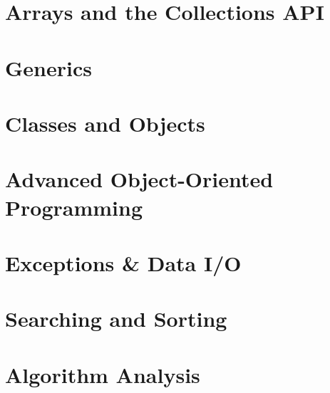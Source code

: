 \chapter{Arrays and the Collections API}
\thispagestyle{chapterstart}
\pagestyle{otherpages}
\label{chapter-arrays-collections}
\setcounter{excounter}{1}
\setcounter{examplecounter}{1}


\chapter{Generics}
\thispagestyle{chapterstart}
\pagestyle{otherpages}
\label{chapter-generics}
\setcounter{excounter}{1}
\setcounter{examplecounter}{1}


\chapter{Classes and Objects}
\thispagestyle{chapterstart}
\pagestyle{otherpages}
\label{chapter-classes}
\setcounter{excounter}{1}
\setcounter{examplecounter}{1}


\chapter{Advanced Object-Oriented Programming}
\thispagestyle{chapterstart}
\pagestyle{otherpages}
\label{chapter-advanced-oop}
\setcounter{excounter}{1}
\setcounter{examplecounter}{1}


\chapter{Exceptions \& Data I/O}
\thispagestyle{chapterstart}
\pagestyle{otherpages}
\label{chapter-exceptions-io}
\setcounter{excounter}{1}
\setcounter{examplecounter}{1}


\chapter{Searching and Sorting}
\thispagestyle{chapterstart}
\pagestyle{otherpages}
\label{chapter-searching-sorting}
\setcounter{excounter}{1}
\setcounter{examplecounter}{1}


\chapter{Algorithm Analysis}
\thispagestyle{chapterstart}
\pagestyle{otherpages}
\label{chapter-algorithms}
\setcounter{excounter}{1}
\setcounter{examplecounter}{1}


